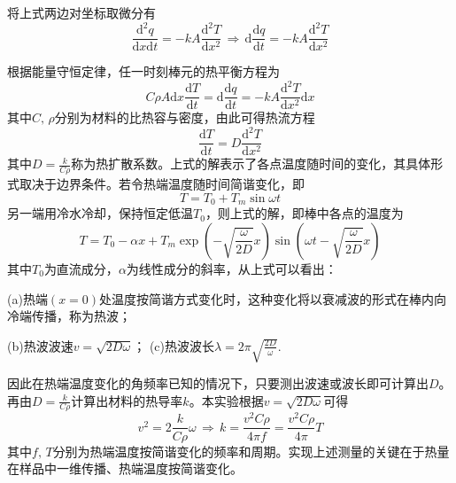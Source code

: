 \documentclass[UTF8]{article}
\theoremstyle{MyLineTheoremStyle} %
\theoremstyle{MyBlockTheoremStyle} %
\theoremstyle{MySubsubsectionStyle} %
\begin{document}
将上式两边对坐标取微分有
\begin{equation}
\frac{\mathrm{d}^2 q}{\mathrm{d} x\mathrm{d} t}=-kA\frac{\mathrm{d}^2 T}{\mathrm{d} x^2}\,\Longrightarrow\,\mathrm{d}\frac{\mathrm{d} q}{\mathrm{d} t}=-kA\frac{\mathrm{d}^2 T}{\mathrm{d} x^2}
\end{equation}

根据能量守恒定律，任一时刻棒元的热平衡方程为
\begin{equation}
C\rho A\mathrm{d} x\frac{\mathrm{d} T}{\mathrm{d} t}=\mathrm{d}\frac{\mathrm{d} q}{\mathrm{d} t}=-kA\frac{\mathrm{d}^2 T}{\mathrm{d} x^2}\mathrm{d} x
\end{equation}
其中$ C,\,\rho $分别为材料的比热容与密度，由此可得热流方程
\begin{equation}
\frac{\mathrm{d} T}{\mathrm{d} t}=D\frac{\mathrm{d}^2 T}{\mathrm{d} x^2}
\end{equation}
其中$ D=\frac{k}{C\rho} $称为热扩散系数。上式的解表示了各点温度随时间的变化，其具体形式取决于边界条件。若令热端温度随时间简谐变化，即
\begin{equation}
T=T_0+T_m\sin\omega t
\end{equation}
另一端用冷水冷却，保持恒定低温$ T_0 $，则上式的解，即棒中各点的温度为
\begin{equation}
T=T_0-\alpha x+T_m\exp\left(-\sqrt{\frac{\omega}{2D}}x\right)\sin\left(\omega t-\sqrt{\frac{\omega}{2D}}x\right)
\end{equation}
其中$ T_0 $为直流成分，$ \alpha $为线性成分的斜率，从上式可以看出：

{\kaishu (a)热端$ (x=0) $处温度按简谐方式变化时，这种变化将以衰减波的形式在棒内向冷端传播，称为热波；}

{\kaishu (b)热波波速$ v=\sqrt{2D\omega} $；}	
{\kaishu (c)热波波长$ \lambda=2\pi\sqrt{\frac{2D}{\omega}} $.}

因此在热端温度变化的角频率已知的情况下，只要测出波速或波长即可计算出$ D $。再由$ D=\frac{k}{C\rho} $计算出材料的热导率$ k $。本实验根据$ v=\sqrt{2D\omega} $可得
\begin{equation}
v^2=2\frac{k}{C\rho}\omega\,\Longrightarrow\,k=\frac{v^2C\rho}{4\pi f}=\frac{v^2C\rho}{4\pi}T
\end{equation}
其中$ f,\,T $分别为热端温度按简谐变化的频率和周期。实现上述测量的关键在于热量在样品中一维传播、热端温度按简谐变化。
\end{document}
